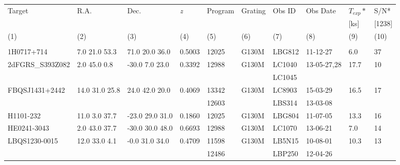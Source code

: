 \documentclass[iop]{emulateapj-rtx4}
\begin{document}
\begin{table}[ht]\footnotesize
\begin{center}
\begin{tabular}{l l l l l l l l l l}
 \hline \hline
  Target 		& R.A. 		& Dec. 		& \textit{z}		 & Program 	  & Grating 	  & Obs ID 	    & Obs Date 	    & $T_{exp}*$     & S/N*  \\ 
  	    		& 	       		&	  		& 		  	 & 		    	  & 		  	  & 		  	   & 		     	    & 	        [ks]        & [1238] \\ 
 \scriptsize (1)  & \scriptsize (2) & \scriptsize (3) & \scriptsize (4) & \scriptsize (5) & \scriptsize (6) & \scriptsize  (7) & \scriptsize (8) & \scriptsize (9) & \scriptsize (10)  \\ \hline \hline

\\
    
1H0717+714		  &  7.0  21.0   53.3  &     71.0  20.0  36.0  &    0.5003  & 12025  	    &   G130M  &   LBG812  		 & 11-12-27      	 	  &  6.0    &      37         \\
2dFGRS\_S393Z082  &  2.0  45.0    0.8   &    -30.0    7.0  23.0  &    0.3392  & 12988  	    &   G130M  &   LC1040    		 & 13-05-27,28 	 	  & 17.7   &      10         \\
				  &			       &				&		  &			    &		      &    LC1045			 &				  &	       &		   \\
FBQSJ1431+2442     & 14.0  31.0  25.8  &     24.0  42.0  20.0  &   0.4069   & 13342		    &   G130M  &   LC8903			& 15-03-29		  & 16.5  &      17          \\
				 &			      &				       &		 & 12603		    &		      &   LBS314			& 13-03-08		  &	      &		  	  \\

H1101-232   		 &  11.0  3.0   37.7  &    -23.0  29.0  31.0  &   0.1860   & 12025  		    &   G130M  &   LBG804  		& 11-07-05  		   & 13.3  &      16         \\
HE0241-3043  		 &   2.0  43.0  37.7  &    -30.0  30.0  48.0  &   0.6693   & 12988  		    &   G130M  &   LC1070  		& 13-06-21  		   & 7.0    &      14         \\
LBQS1230-0015  	 &   12.0  33.0  4.1  &    -0.0  31.0  34.0    &    0.4709  & 11598   	    &   G130M  &   LB5N15			& 10-08-01  		   & 10.3  &      13         \\
				 &			      &				       &		 & 12486		    &		      &   LBP250			& 12-04-26		   &	       &	  	   \\


\end{tabular}
\end{center}
\end{table}
\end{document}
